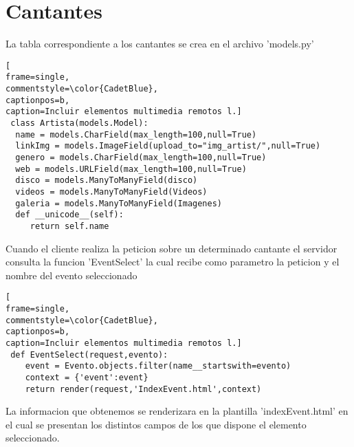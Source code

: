 \section{Cantantes}
La tabla correspondiente a los cantantes se crea en el archivo 'models.py' 
\lstset{language=, breaklines=true, basicstyle=\footnotesize}
\begin{lstlisting}[
frame=single,
commentstyle=\color{CadetBlue},
captionpos=b,
caption=Incluir elementos multimedia remotos l.]
 class Artista(models.Model):
  name = models.CharField(max_length=100,null=True)
  linkImg = models.ImageField(upload_to="img_artist/",null=True)
  genero = models.CharField(max_length=100,null=True)
  web = models.URLField(max_length=100,null=True)
  disco = models.ManyToManyField(disco)
  videos = models.ManyToManyField(Videos) 
  galeria = models.ManyToManyField(Imagenes)
  def __unicode__(self):
	 return self.name
\end{lstlisting}
Cuando el cliente realiza la peticion sobre un determinado cantante el servidor consulta la funcion 'EventSelect'  la cual recibe como parametro la peticion y el nombre del evento seleccionado
\begin{lstlisting}[
frame=single,
commentstyle=\color{CadetBlue},
captionpos=b,
caption=Incluir elementos multimedia remotos l.]
 def EventSelect(request,evento):
	event = Evento.objects.filter(name__startswith=evento)
	context = {'event':event}
	return render(request,'IndexEvent.html',context)
\end{lstlisting}
La informacion que obtenemos se renderizara en la plantilla 'indexEvent.html' en el cual se presentan los distintos campos de los que dispone el elemento seleccionado.
\lstset{language=, breaklines=true, basicstyle=\footnotesize}
